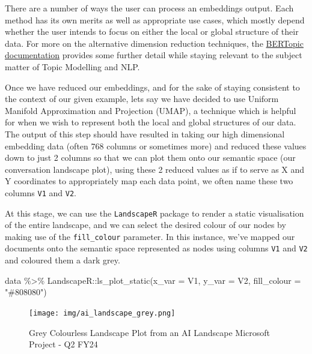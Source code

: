 \documentclass[
  letterpaper,
  DIV=11,
  numbers=noendperiod]{scrreprt}
\newenvironment{Shaded}{\begin{snugshade}}{\end{snugshade}}
\newcommand{\AttributeTok}[1]{\textcolor[rgb]{0.40,0.45,0.13}{#1}}
\newcommand{\FunctionTok}[1]{\textcolor[rgb]{0.28,0.35,0.67}{#1}}
\newcommand{\NormalTok}[1]{\textcolor[rgb]{0.00,0.23,0.31}{#1}}
\newcommand{\SpecialCharTok}[1]{\textcolor[rgb]{0.37,0.37,0.37}{#1}}
\newcommand{\StringTok}[1]{\textcolor[rgb]{0.13,0.47,0.30}{#1}}
\begin{document}
There are a number of ways the user can process an embeddings output.
Each method has its own merits as well as appropriate use cases, which
mostly depend whether the user intends to focus on either the local or
global structure of their data. For more on the alternative dimension
reduction techniques, the
\href{https://maartengr.github.io/BERTopic/getting_started/dim_reduction/dim_reduction.html}{BERTopic
documentation} provides some further detail while staying relevant to
the subject matter of Topic Modelling and NLP.

Once we have reduced our embeddings, and for the sake of staying
consistent to the context of our given example, lets say we have decided
to use Uniform Manifold Approximation and Projection (UMAP), a technique
which is helpful for when we wish to represent both the local and global
structures of our data. The output of this step should have resulted in
taking our high dimensional embedding data (often 768 columns or
sometimes more) and reduced these values down to just 2 columns so that
we can plot them onto our semantic space (our conversation landscape
plot), using these 2 reduced values as if to serve as X and Y
coordinates to appropriately map each data point, we often name these
two columns \texttt{V1} and \texttt{V2}.

At this stage, we can use the \texttt{LandscapeR} package to render a
static visualisation of the entire landscape, and we can select the
desired colour of our nodes by making use of the \texttt{fill\_colour}
parameter. In this instance, we've mapped our documents onto the
semantic space represented as nodes using columns \texttt{V1} and
\texttt{V2} and coloured them a dark grey.

\begin{Shaded}
\begin{Highlighting}[]
\NormalTok{data }\SpecialCharTok{\%\textgreater{}\%} 
\NormalTok{  LandscapeR}\SpecialCharTok{::}\FunctionTok{ls\_plot\_static}\NormalTok{(}\AttributeTok{x\_var =}\NormalTok{ V1,}
                             \AttributeTok{y\_var =}\NormalTok{ V2,}
                             \AttributeTok{fill\_colour =} \StringTok{"\#808080"}\NormalTok{)}
\end{Highlighting}
\end{Shaded}

\begin{figure}[H]

{\centering \texttt{[image: img/ai\_landscape\_grey.png]}

}

\caption{Grey Colourless Landscape Plot from an AI Landscape Microsoft
Project - Q2 FY24}

\end{figure}%
\end{document}
